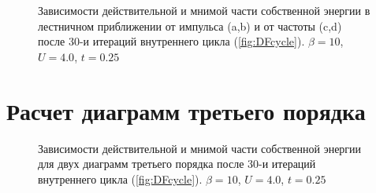 \documentclass[11pt,a4paper]{report}
\begin{document}
\begin{figure}[H]
\caption{Зависимости действительной и мнимой части собственной энергии в лестничном приближении от импульса (a,b) и от частоты (c,d) после 30-и итераций внутреннего цикла (\ref{fig:DFcycle}). $\beta=10$, $U=4.0$, $t=0.25$}
\label{SigmaLDFA}
\end{figure}

\section{Расчет диаграмм третьего порядка}

\begin{figure}[H]
\centering
{}

\caption{Зависимости действительной и мнимой части собственной энергии для двух диаграмм третьего порядка после 30-и итераций внутреннего цикла (\ref{fig:DFcycle}). $\beta=10$, $U=4.0$, $t=0.25$}
\label{SigmaLDFA}
\end{figure}
\end{document}
